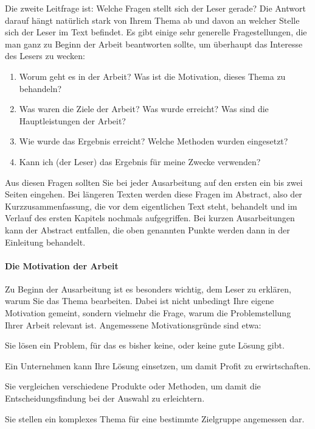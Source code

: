 Die zweite Leitfrage ist: Welche Fragen stellt sich der Leser gerade?
Die Antwort darauf hängt natürlich stark von Ihrem Thema ab und davon an welcher Stelle sich der Leser im Text befindet.
Es gibt einige sehr generelle Fragestellungen, die man ganz zu Beginn der Arbeit beantworten sollte, um überhaupt das Interesse des Lesers zu wecken:
\begin{enumerate}
\item Worum geht es in der Arbeit? Was ist die Motivation, dieses Thema zu behandeln?
\item Was waren die Ziele der Arbeit? Was wurde erreicht? Was sind die Hauptleistungen der Arbeit?
\item Wie wurde das Ergebnis erreicht? Welche Methoden wurden eingesetzt?
\item Kann ich (der Leser) das Ergebnis für meine Zwecke verwenden?
\end{enumerate}

Aus diesen Fragen sollten Sie bei jeder Ausarbeitung auf den ersten ein bis zwei Seiten eingehen.
Bei längeren Texten werden diese Fragen im Abstract, also der Kurzzusammenfassung, die vor dem eigentlichen Text steht, behandelt und im Verlauf des ersten Kapitels nochmals aufgegriffen.
Bei kurzen Ausarbeitungen kann der Abstract entfallen, die oben genannten Punkte werden dann in der Einleitung behandelt.

\paragraph{Die Motivation der Arbeit}

Zu Beginn der Ausarbeitung ist es besonders wichtig, dem Leser zu erklären, warum Sie das Thema bearbeiten.
Dabei ist nicht unbedingt Ihre eigene Motivation gemeint, sondern vielmehr die Frage, warum die Problemstellung Ihrer Arbeit relevant ist.
Angemessene Motivationsgründe sind etwa:
\begin{compactitem}
\item Sie lösen ein Problem, für das es bisher keine, oder keine gute Lösung gibt.
\item Ein Unternehmen kann Ihre Lösung einsetzen, um damit Profit zu erwirtschaften.
\item Sie vergleichen verschiedene Produkte oder Methoden, um damit die Entscheidungsfindung bei der Auswahl zu erleichtern.
\item Sie stellen ein komplexes Thema für eine bestimmte Zielgruppe angemessen dar.
\end{compactitem}


